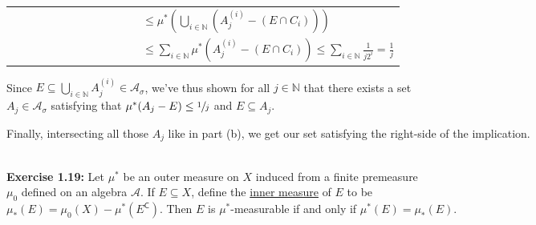 \documentclass{book}
\newenvironment{myIndent}{%
   \begin{adjustwidth}{2.5em}{0em}%
}{%
   \end{adjustwidth}%
}
\newcommand{\udefine}[1]{{%
   \setulcolor{Red}%
   \setul{0.14em}{0.07em}%
   \ul{#1}%
}}
\newcommand{\blab}[1]{\textbf{#1}}
\newcommand{\comp}{\mathsf{C}}
\newcommand{\mySepTwo}[1][.]{%
   {\noindent\color{#1}{\rule{6.5in}{0.5mm}}}\\%
}
\newcommand{\retTwo}{\hfill\bigbreak}
\begin{document}
\begin{enumerate}
\begin{myIndent}
{\begin{tabular}{l}
         $\phantom{\mu^*((\bigcup\limits_{i\in\mathbb{N}}A_j^{(i)}) - E) } \leq \mu^*(\bigcup\limits_{i\in\mathbb{N}}(A_j^{(i)} - (E \cap C_i)))$\\
         
         $\phantom{\mu^*((\bigcup\limits_{i\in\mathbb{N}}A_j^{(i)}) - E) } \leq \sum\limits_{i \in \mathbb{N}}\mu^*(A_j^{(i)} - (E \cap C_i)) \leq \sum\limits_{i \in \mathbb{N}}\frac{1}{j2^i} = \frac{1}{j}$
      \end{tabular} \retTwo\par}

      Since $E \subseteq \bigcup\limits_{i \in \mathbb{N}}A_j^{(i)} \in \mathcal{A}_\sigma$, we've thus shown for all $j \in \mathbb{N}$ that there exists a set\\ [-8pt]\phantom{Aaaaaaaaaaaaaaaaaa} $A_j \in \mathcal{A}_\sigma$ satisfying that $\mu^*(A_j - E) \leq \sfrac{1}{j}$ and $E \subseteq A_j$.\retTwo

      Finally, intersecting all those $A_j$ like in part (b), we get our set satisfying the right-side of the implication.\retTwo
   \end{myIndent}
\end{enumerate}

\mySepTwo

\blab{Exercise 1.19:} Let $\mu^*$ be an outer measure on $X$ induced from a finite premeasure\\ $\mu_0$ defined on an algebra $\mathcal{A}$. If $E \subseteq X$, define the \udefine{inner measure} of $E$ to be\\ $\mu_*(E) = \mu_0(X) - \mu^*(E^\comp)$. Then $E$ is $\mu^*$-measurable if and only if $\mu^*(E) = \mu_*(E)$.\\ [-9pt]
\end{document}
